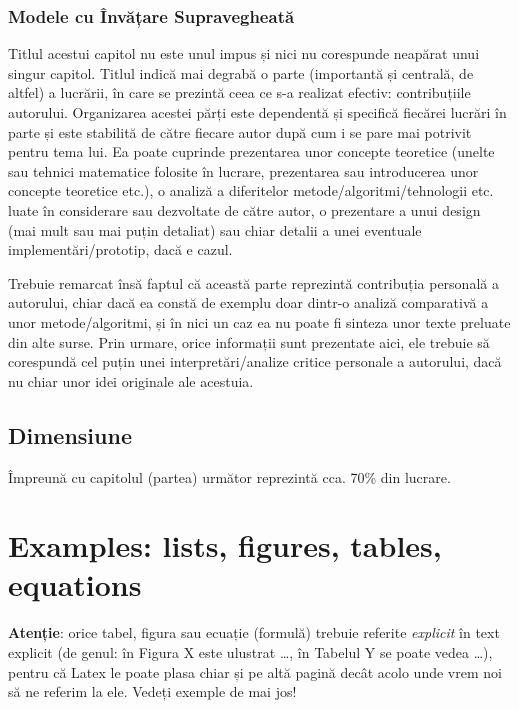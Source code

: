 \subsubsection{Modele cu Învățare Supravegheată}













Titlul acestui capitol nu este unul impus și nici nu corespunde neapărat unui singur capitol. Titlul indică mai degrabă o parte (importantă și centrală, de altfel) a lucrării, în care se prezintă ceea ce s-a realizat efectiv: contribuțiile autorului. Organizarea acestei părți este dependentă și specifică fiecărei lucrări în parte și este stabilită de către fiecare autor după cum i se pare mai potrivit pentru tema lui. Ea poate cuprinde prezentarea unor concepte teoretice (unelte sau tehnici matematice folosite în lucrare, prezentarea sau introducerea unor concepte teoretice etc.), o analiză a diferitelor metode/algoritmi/tehnologii etc. luate în considerare sau dezvoltate de către autor, o prezentare a unui design (mai mult sau mai puțin detaliat) sau chiar detalii a unei eventuale implementări/prototip, dacă e cazul.

Trebuie remarcat însă faptul că această parte reprezintă contribuția personală a autorului, chiar dacă ea constă de exemplu doar dintr-o analiză comparativă a unor metode/algoritmi, și în nici un caz ea nu poate fi sinteza unor texte preluate din alte surse. Prin urmare, orice informații sunt prezentate aici, ele trebuie să corespundă cel puțin unei interpretări/analize critice personale a autorului, dacă nu chiar unor idei originale ale acestuia. 

\subsection{Dimensiune}

Împreună cu capitolul (partea) următor reprezintă cca. 70\% din lucrare. 


\section{Examples: lists, figures, tables, equations}


\textbf{Atenție}: orice tabel, figura sau ecuație (formulă) trebuie referite \textit{explicit} în text explicit (de genul: în Figura X este ulustrat \dots, în Tabelul Y se poate vedea \dots), pentru că Latex le poate plasa chiar și pe altă pagină decât acolo unde vrem noi să ne referim la ele. Vedeți exemple de mai jos!

